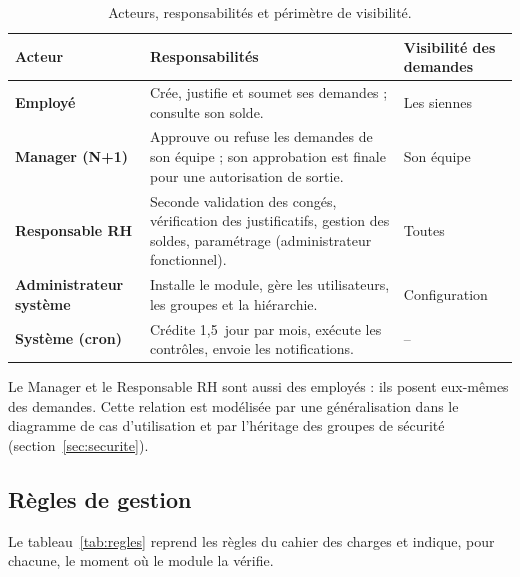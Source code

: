 \documentclass[11pt,a4paper]{article}
\begin{document}
\begin{table}[H]
\centering
\caption{Acteurs, responsabilités et périmètre de visibilité.}
\label{tab:acteurs}
\small
\begin{tabularx}{\textwidth}{>{\bfseries}l Y l}
\toprule
Acteur & Responsabilités & Visibilité des demandes \\
\midrule
Employé & Crée, justifie et soumet ses demandes ; consulte son solde. & Les siennes \\
Manager (N+1) & Approuve ou refuse les demandes de son équipe ; son approbation est finale
pour une autorisation de sortie. & Son équipe \\
Responsable RH & Seconde validation des congés, vérification des justificatifs, gestion des soldes,
paramétrage (administrateur fonctionnel). & Toutes \\
Administrateur système & Installe le module, gère les utilisateurs, les groupes et la hiérarchie. &
Configuration \\
Système (cron) & Crédite 1,5~jour par mois, exécute les contrôles, envoie les notifications. &
-- \\
\bottomrule
\end{tabularx}
\end{table}

Le Manager et le Responsable RH sont aussi des employés : ils posent eux-mêmes des demandes. Cette
relation est modélisée par une généralisation dans le diagramme de cas d'utilisation et par
l'héritage des groupes de sécurité (section~\ref{sec:securite}).

\subsection{Règles de gestion}
Le tableau~\ref{tab:regles} reprend les règles du cahier des charges et indique, pour chacune,
le moment où le module la vérifie.
\end{document}
